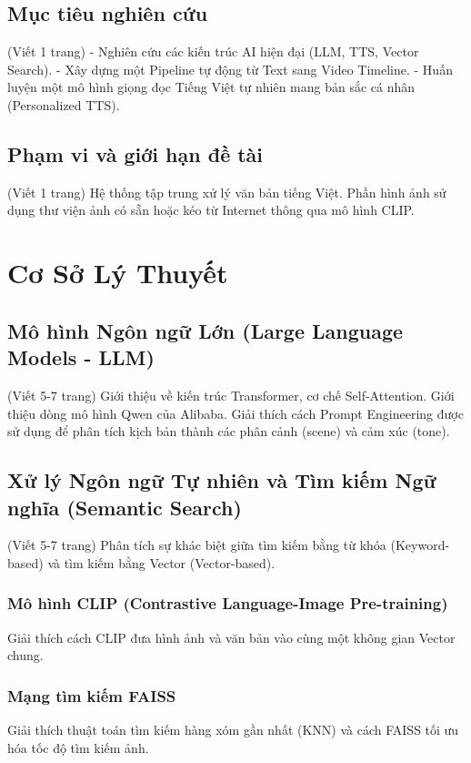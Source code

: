 \documentclass[a4paper,13pt]{report}
\begin{document}
\section{Mục tiêu nghiên cứu}
(Viết 1 trang)
- Nghiên cứu các kiến trúc AI hiện đại (LLM, TTS, Vector Search).
- Xây dựng một Pipeline tự động từ Text sang Video Timeline.
- Huấn luyện một mô hình giọng đọc Tiếng Việt tự nhiên mang bản sắc cá nhân (Personalized TTS).

\section{Phạm vi và giới hạn đề tài}
(Viết 1 trang)
Hệ thống tập trung xử lý văn bản tiếng Việt. Phần hình ảnh sử dụng thư viện ảnh có sẵn hoặc kéo từ Internet thông qua mô hình CLIP.

\chapter{Cơ Sở Lý Thuyết}

\section{Mô hình Ngôn ngữ Lớn (Large Language Models - LLM)}
(Viết 5-7 trang)
Giới thiệu về kiến trúc Transformer, cơ chế Self-Attention. Giới thiệu dòng mô hình Qwen của Alibaba. Giải thích cách Prompt Engineering được sử dụng để phân tích kịch bản thành các phân cảnh (scene) và cảm xúc (tone).

\section{Xử lý Ngôn ngữ Tự nhiên và Tìm kiếm Ngữ nghĩa (Semantic Search)}
(Viết 5-7 trang)
Phân tích sự khác biệt giữa tìm kiếm bằng từ khóa (Keyword-based) và tìm kiếm bằng Vector (Vector-based). 
\subsection{Mô hình CLIP (Contrastive Language-Image Pre-training)}
Giải thích cách CLIP đưa hình ảnh và văn bản vào cùng một không gian Vector chung.
\subsection{Mạng tìm kiếm FAISS}
Giải thích thuật toán tìm kiếm hàng xóm gần nhất (KNN) và cách FAISS tối ưu hóa tốc độ tìm kiếm ảnh.
\end{document}
